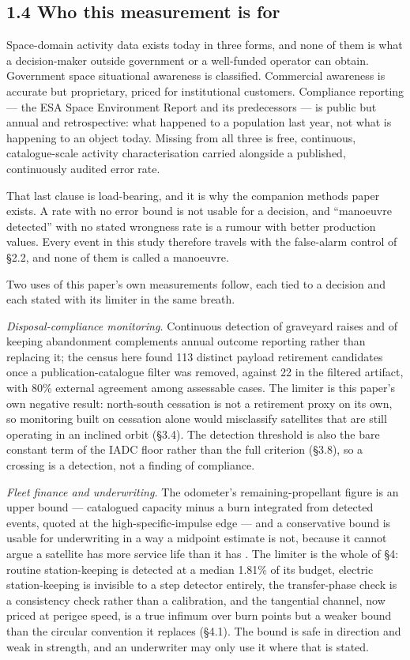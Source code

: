 \documentclass[11pt]{article}
\begin{document}
\subsection*{1.4 Who this measurement is for}

Space-domain activity data exists today in three forms, and none of them is what a decision-maker outside government or a well-funded operator can obtain. Government space situational awareness is classified. Commercial awareness is accurate but proprietary, priced for institutional customers. Compliance reporting --- the ESA Space Environment Report and its predecessors --- is public but annual and retrospective: what happened to a population last year, not what is happening to an object today. Missing from all three is free, continuous, catalogue-scale activity characterisation carried alongside a published, continuously audited error rate.

That last clause is load-bearing, and it is why the companion methods paper exists. A rate with no error bound is not usable for a decision, and ``manoeuvre detected'' with no stated wrongness rate is a rumour with better production values. Every event in this study therefore travels with the false-alarm control of \S{}2.2, and none of them is called a manoeuvre.

Two uses of this paper's own measurements follow, each tied to a decision and each stated with its limiter in the same breath.

\emph{Disposal-compliance monitoring.} Continuous detection of graveyard raises and of keeping abandonment complements annual outcome reporting rather than replacing it; the census here found 113 distinct payload retirement candidates once a publication-catalogue filter was removed, against 22 in the filtered artifact, with 80\% external agreement among assessable cases. The limiter is this paper's own negative result: north-south cessation is not a retirement proxy on its own, so monitoring built on cessation alone would misclassify satellites that are still operating in an inclined orbit (\S{}3.4). The detection threshold is also the bare constant term of the IADC floor rather than the full criterion (\S{}3.8), so a crossing is a detection, not a finding of compliance.

\emph{Fleet finance and underwriting.} The odometer's remaining-propellant figure is an upper bound --- catalogued capacity minus a burn integrated from detected events, quoted at the high-specific-impulse edge --- and a conservative bound is usable for underwriting in a way a midpoint estimate is not, because it cannot argue a satellite has more service life than it has%
. The limiter is the whole of \S{}4: routine station-keeping is detected at a median 1.81\% of its budget, electric station-keeping is invisible to a step detector entirely, the transfer-phase check is a consistency check rather than a calibration, and the tangential channel, now priced at perigee speed, is a true infimum over burn points but a weaker bound than the circular convention it replaces (\S{}4.1). The bound is safe in direction and weak in strength, and an underwriter may only use it where that is stated.
\end{document}
